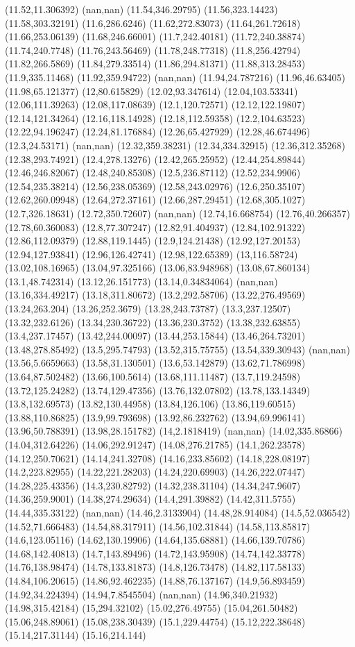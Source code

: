 (11.52,11.306392) (nan,nan) (11.54,346.29795) (11.56,323.14423) (11.58,303.32191) (11.6,286.6246) (11.62,272.83073) (11.64,261.72618) (11.66,253.06139) (11.68,246.66001) (11.7,242.40181) (11.72,240.38874) (11.74,240.7748) (11.76,243.56469) (11.78,248.77318) (11.8,256.42794) (11.82,266.5869) (11.84,279.33514) (11.86,294.81371) (11.88,313.28453) (11.9,335.11468) (11.92,359.94722) (nan,nan) (11.94,24.787216) (11.96,46.63405) (11.98,65.121377) (12,80.615829) (12.02,93.347614) (12.04,103.53341) (12.06,111.39263) (12.08,117.08639) (12.1,120.72571) (12.12,122.19807) (12.14,121.34264) (12.16,118.14928) (12.18,112.59358) (12.2,104.63523) (12.22,94.196247) (12.24,81.176884) (12.26,65.427929) (12.28,46.674496) (12.3,24.53171) (nan,nan) (12.32,359.38231) (12.34,334.32915) (12.36,312.35268) (12.38,293.74921) (12.4,278.13276) (12.42,265.25952) (12.44,254.89844) (12.46,246.82067) (12.48,240.85308) (12.5,236.87112) (12.52,234.9906) (12.54,235.38214) (12.56,238.05369) (12.58,243.02976) (12.6,250.35107) (12.62,260.09948) (12.64,272.37161) (12.66,287.29451) (12.68,305.1027) (12.7,326.18631) (12.72,350.72607) (nan,nan) (12.74,16.668754) (12.76,40.266357) (12.78,60.360083) (12.8,77.307247) (12.82,91.404937) (12.84,102.91322) (12.86,112.09379) (12.88,119.1445) (12.9,124.21438) (12.92,127.20153) (12.94,127.93841) (12.96,126.42741) (12.98,122.65389) (13,116.58724) (13.02,108.16965) (13.04,97.325166) (13.06,83.948968) (13.08,67.860134) (13.1,48.742314) (13.12,26.151773) (13.14,0.34834064) (nan,nan) (13.16,334.49217) (13.18,311.80672) (13.2,292.58706) (13.22,276.49569) (13.24,263.204) (13.26,252.3679) (13.28,243.73787) (13.3,237.12507) (13.32,232.6126) (13.34,230.36722) (13.36,230.3752) (13.38,232.63855) (13.4,237.17457) (13.42,244.00097) (13.44,253.15844) (13.46,264.73201) (13.48,278.85492) (13.5,295.74793) (13.52,315.75755) (13.54,339.30943) (nan,nan) (13.56,5.6659663) (13.58,31.130501) (13.6,53.142879) (13.62,71.786998) (13.64,87.502482) (13.66,100.5614) (13.68,111.11487) (13.7,119.24598) (13.72,125.24282) (13.74,129.47356) (13.76,132.07802) (13.78,133.14349) (13.8,132.69573) (13.82,130.44958) (13.84,126.106) (13.86,119.60515) (13.88,110.86825) (13.9,99.793698) (13.92,86.232762) (13.94,69.996141) (13.96,50.788391) (13.98,28.151782) (14,2.1818419) (nan,nan) (14.02,335.86866) (14.04,312.64226) (14.06,292.91247) (14.08,276.21785) (14.1,262.23578) (14.12,250.70621) (14.14,241.32708) (14.16,233.85602) (14.18,228.08197) (14.2,223.82955) (14.22,221.28203) (14.24,220.69903) (14.26,222.07447) (14.28,225.43356) (14.3,230.82792) (14.32,238.31104) (14.34,247.9607) (14.36,259.9001) (14.38,274.29634) (14.4,291.39882) (14.42,311.5755) (14.44,335.33122) (nan,nan) (14.46,2.3133904) (14.48,28.914084) (14.5,52.036542) (14.52,71.666483) (14.54,88.317911) (14.56,102.31844) (14.58,113.85817) (14.6,123.05116) (14.62,130.19906) (14.64,135.68881) (14.66,139.70786) (14.68,142.40813) (14.7,143.89496) (14.72,143.95908) (14.74,142.33778) (14.76,138.98474) (14.78,133.81873) (14.8,126.73478) (14.82,117.58133) (14.84,106.20615) (14.86,92.462235) (14.88,76.137167) (14.9,56.893459) (14.92,34.224394) (14.94,7.8545504) (nan,nan) (14.96,340.21932) (14.98,315.42184) (15,294.32102) (15.02,276.49755) (15.04,261.50482) (15.06,248.89061) (15.08,238.30439) (15.1,229.44754) (15.12,222.38648) (15.14,217.31144) (15.16,214.144) 